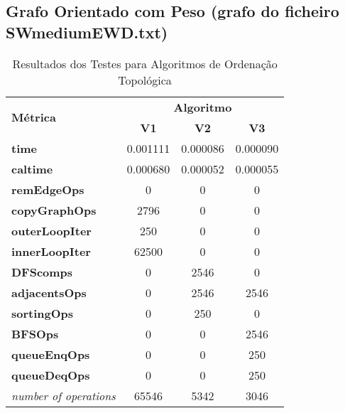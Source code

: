 \documentclass{report}
\begin{document}
\newpage

\subsection{Grafo Orientado com Peso (grafo do ficheiro SWmediumEWD.txt)}


\begin{table}[ht]
\centering
\label{tab:resultados}
\large
\begin{tabular}{|l|c|c|c|}
\hline
\multirow{2}{*}{\textbf{Métrica}} & \multicolumn{3}{c|}{\textbf{Algoritmo}} \\ \cline{2-4} 
                                  & \textbf{V1} & \textbf{V2} & \textbf{V3} \\ \hline
\textbf{time}                     & 0.001111    & 0.000086    & 0.000090    \\ \hline
\textbf{caltime}                  & 0.000680    & 0.000052    & 0.000055    \\ \hline
\textbf{remEdgeOps}               & 0           & 0           & 0           \\ \hline
\textbf{copyGraphOps}             & 2796        & 0           & 0           \\ \hline
\textbf{outerLoopIter}            & 250         & 0           & 0           \\ \hline
\textbf{innerLoopIter}            & 62500       & 0           & 0           \\ \hline
\textbf{DFScomps}                 & 0           & 2546        & 0           \\ \hline
\textbf{adjacentsOps}             & 0           & 2546        & 2546        \\ \hline
\textbf{sortingOps}               & 0           & 250         & 0           \\ \hline
\textbf{BFSOps}                   & 0           & 0           & 2546        \\ \hline
\textbf{queueEnqOps}              & 0           & 0           & 250         \\ \hline
\textbf{queueDeqOps}              & 0           & 0           & 250         \\ \hline
\textit{number of operations}     & 65546       & 5342      & 3046          \\ \hline 
\end{tabular}

\caption{Resultados dos Testes para Algoritmos de Ordenação Topológica}
\end{table}
\end{document}
